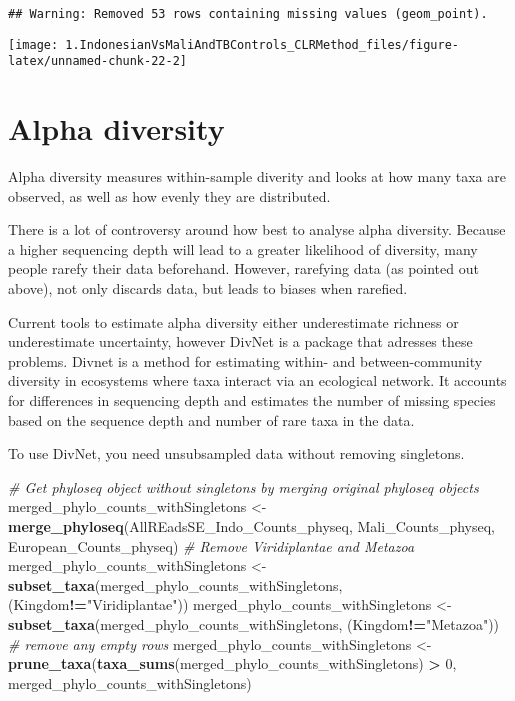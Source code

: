 \documentclass[]{article}
\newenvironment{Shaded}{\begin{snugshade}}{\end{snugshade}}
\newcommand{\CommentTok}[1]{\textcolor[rgb]{0.56,0.35,0.01}{\textit{#1}}}
\newcommand{\DecValTok}[1]{\textcolor[rgb]{0.00,0.00,0.81}{#1}}
\newcommand{\KeywordTok}[1]{\textcolor[rgb]{0.13,0.29,0.53}{\textbf{#1}}}
\newcommand{\NormalTok}[1]{#1}
\newcommand{\OperatorTok}[1]{\textcolor[rgb]{0.81,0.36,0.00}{\textbf{#1}}}
\newcommand{\StringTok}[1]{\textcolor[rgb]{0.31,0.60,0.02}{#1}}
\begin{document}
\begin{verbatim}
## Warning: Removed 53 rows containing missing values (geom_point).
\end{verbatim}

\begin{center}\texttt{[image: 1.IndonesianVsMaliAndTBControls\_CLRMethod\_files/figure-latex/unnamed-chunk-22-2]} \end{center}

\hypertarget{alpha-diversity}{%
\section{Alpha diversity}\label{alpha-diversity}}

Alpha diversity measures within-sample diverity and looks at how many
taxa are observed, as well as how evenly they are distributed.

There is a lot of controversy around how best to analyse alpha
diversity. Because a higher sequencing depth will lead to a greater
likelihood of diversity, many people rarefy their data beforehand.
However, rarefying data (as pointed out above), not only discards data,
but leads to biases when rarefied.

Current tools to estimate alpha diversity either underestimate richness
or underestimate uncertainty, however DivNet is a package that adresses
these problems. Divnet is a method for estimating within- and
between-community diversity in ecosystems where taxa interact via an
ecological network. It accounts for differences in sequencing depth and
estimates the number of missing species based on the sequence depth and
number of rare taxa in the data.

To use DivNet, you need unsubsampled data without removing singletons.

\begin{Shaded}
\begin{Highlighting}[]
\CommentTok{# Get phyloseq object without singletons by merging original phyloseq objects}
\NormalTok{merged_phylo_counts_withSingletons <-}\StringTok{ }\KeywordTok{merge_phyloseq}\NormalTok{(AllREadsSE_Indo_Counts_physeq, Mali_Counts_physeq, European_Counts_physeq)}
\CommentTok{# Remove Viridiplantae and Metazoa}
\NormalTok{merged_phylo_counts_withSingletons <-}\StringTok{ }\KeywordTok{subset_taxa}\NormalTok{(merged_phylo_counts_withSingletons, (Kingdom}\OperatorTok{!=}\StringTok{"Viridiplantae"}\NormalTok{))}
\NormalTok{merged_phylo_counts_withSingletons <-}\StringTok{ }\KeywordTok{subset_taxa}\NormalTok{(merged_phylo_counts_withSingletons, (Kingdom}\OperatorTok{!=}\StringTok{"Metazoa"}\NormalTok{))}
\CommentTok{# remove any empty rows}
\NormalTok{merged_phylo_counts_withSingletons <-}\StringTok{ }\KeywordTok{prune_taxa}\NormalTok{(}\KeywordTok{taxa_sums}\NormalTok{(merged_phylo_counts_withSingletons) }\OperatorTok{>}\StringTok{ }\DecValTok{0}\NormalTok{, merged_phylo_counts_withSingletons)}
\end{Highlighting}
\end{Shaded}
\end{document}
